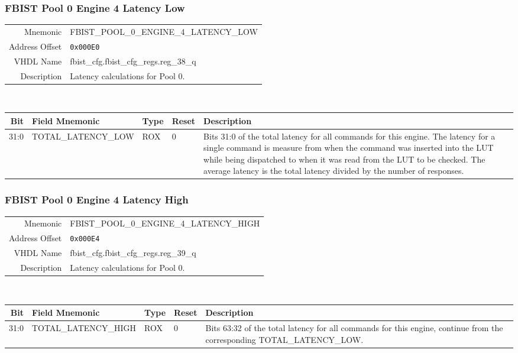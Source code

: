 \subsubsection{FBIST Pool 0 Engine 4 Latency Low}
\begin{tabular}{ r | p{350px} }
  Mnemonic       & FBIST\_POOL\_0\_ENGINE\_4\_LATENCY\_LOW \\
  Address Offset & \texttt{0x000E0}                        \\
  VHDL Name      &  fbist\_cfg.fbist\_cfg\_regs.reg\_38\_q \\ \hline

  Description &
  Latency calculations for Pool 0. \\
\end{tabular}
\\
\begin{tabularx}{\textwidth}{r|l|l|l|X}
  \hline
  Bit   & Field Mnemonic      & Type & Reset & Description \\ \hline

  31:0  & TOTAL\_LATENCY\_LOW & ROX  & 0     &

  Bits 31:0 of the total latency for all commands for this engine. The
  latency for a single command is measure from when the command was
  inserted into the LUT while being dispatched to when it was read
  from the LUT to be checked. The average latency is the total latency
  divided by the number of responses. \\
\end{tabularx}

\subsubsection{FBIST Pool 0 Engine 4 Latency High}
\begin{tabular}{ r | p{350px} }
  Mnemonic       & FBIST\_POOL\_0\_ENGINE\_4\_LATENCY\_HIGH \\
  Address Offset & \texttt{0x000E4}                         \\
  VHDL Name      &  fbist\_cfg.fbist\_cfg\_regs.reg\_39\_q  \\ \hline

  Description &
  Latency calculations for Pool 0. \\
\end{tabular}
\\
\begin{tabularx}{\textwidth}{r|l|l|l|X}
  \hline
  Bit   & Field Mnemonic       & Type & Reset & Description \\ \hline

  31:0  & TOTAL\_LATENCY\_HIGH & ROX  & 0     &

  Bits 63:32 of the total latency for all commands for this engine,
  continue from the corresponding TOTAL\_LATENCY\_LOW. \\
\end{tabularx}

